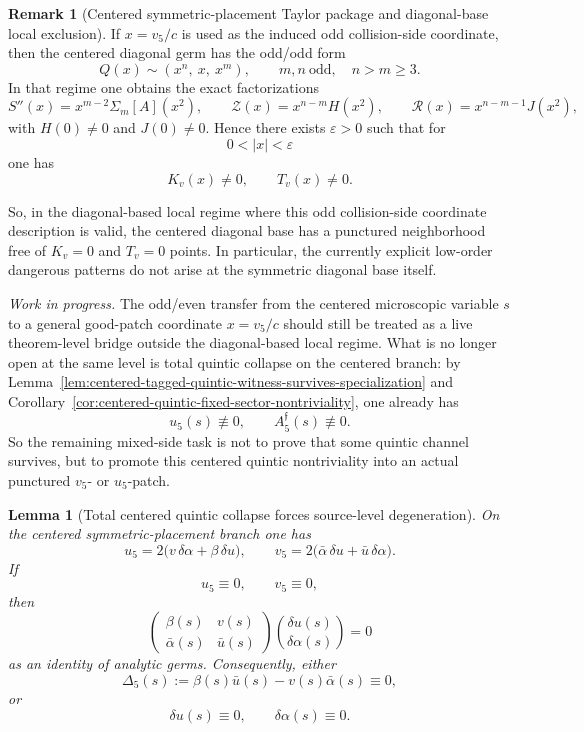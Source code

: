 \documentclass[11pt,a4paper]{amsart}
\theoremstyle{plain}
\newtheorem{lemma}[theorem]{Lemma}
\theoremstyle{definition}
\newtheorem{remark}[theorem]{Remark}
\begin{document}
\begin{remark}[Centered symmetric-placement Taylor package and diagonal-base local exclusion]
If $x=v_5/c$ is used as the induced odd collision-side coordinate, then the
centered diagonal germ has the odd/odd form
\[
Q(x)\sim (x^n,\ x,\ x^m),
\qquad
m,n\ \text{odd},\quad n>m\ge 3.
\]
In that regime one obtains the exact factorizations
\[
S''(x)=x^{m-2}\Sigma_m[A](x^2),
\qquad
\mathcal Z(x)=x^{n-m}H(x^2),
\qquad
\mathcal R(x)=x^{n-m-1}J(x^2),
\]
with $H(0)\neq 0$ and $J(0)\neq 0$. Hence there exists $\varepsilon>0$
such that for
\[
0<|x|<\varepsilon
\]
one has
\[
K_v(x)\neq 0,\qquad T_v(x)\neq 0.
\]

So, in the diagonal-based local regime where this odd collision-side coordinate
description is valid, the centered diagonal base has a punctured neighborhood
free of $K_v=0$ and $T_v=0$ points. In particular, the currently explicit
low-order dangerous patterns do not arise at the symmetric diagonal base itself.

\medskip

\noindent
\textit{Work in progress.}
The odd/even transfer from the centered microscopic variable $s$ to a general
good-patch coordinate $x=v_5/c$ should still be treated as a live theorem-level
bridge outside the diagonal-based local regime. What is no longer open at the
same level is total quintic collapse on the centered branch: by
Lemma~\ref{lem:centered-tagged-quintic-witness-survives-specialization} and
Corollary~\ref{cor:centered-quintic-fixed-sector-nontriviality}, one already
has
\[
u_5(s)\not\equiv 0,
\qquad
A_5^{\mathfrak f}(s)\not\equiv 0.
\]
So the remaining mixed-side task is not to prove that some quintic channel
survives, but to promote this centered quintic nontriviality into an actual
punctured $v_5$- or $u_5$-patch.
\end{remark}

\begin{lemma}[Total centered quintic collapse forces source-level degeneration]
\label{lem:total-centered-quintic-collapse}
On the centered symmetric-placement branch one has
\[
u_5=2\bigl(v\,\delta\alpha+\beta\,\delta u\bigr),
\qquad
v_5=2\bigl(\bar\alpha\,\delta u+\bar u\,\delta\alpha\bigr).
\]
If
\[
u_5\equiv 0,
\qquad
v_5\equiv 0,
\]
then
\[
\begin{pmatrix}
\beta(s) & v(s)\\
\bar\alpha(s) & \bar u(s)
\end{pmatrix}
\binom{\delta u(s)}{\delta\alpha(s)}
=0
\]
as an identity of analytic germs. Consequently, either
\[
\Delta_5(s):=\beta(s)\bar u(s)-v(s)\bar\alpha(s)\equiv 0,
\]
or
\[
\delta u(s)\equiv 0,
\qquad
\delta\alpha(s)\equiv 0.
\]
\end{lemma}
\end{document}
